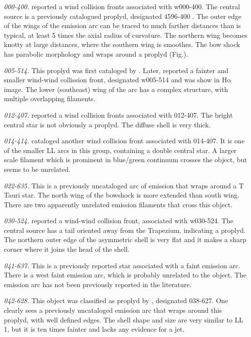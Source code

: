 \documentclass[iop, apj]{emulateapj}
\newcommand\ha{\ensuremath{\mathrm{H\alpha}}}
\begin{document}
\textit{000-400.} \citet{Bally:2000a} reported a wind collision fronts associated with w000-400. The central source is a previously catalogued proplyd, designated 4596-400 \citep{Ricci:2008a}. The outer edge of the wings of the emission arc can be traced to much farther distances than is typical, at least 5 times the axial radius of curvature. The northern wing becomes knotty at large distances, where  the southern wing is smoothes. The bow shock has parabolic morphology and wraps around a proplyd (Fig.).   

\textit{005-514.} This proplyd was first cataloged by \citet{ODell:1996a}. Later, \citet{Bally:2000a} reported a fainter and smaller wind-wind collission front, designated w005-514 and was show in \ha{} image. The lower (southeast) wing of the arc has a complex structure, with multiple overlapping filaments.

\textit{012-407.} \citet{Bally:2000a} reported a wind collision fronts associated with 012-407. The bright central star is not obviously a proplyd. The diffuse shell is very thick.  

\textit{014-414.} \citet{Bally:2000a} cataloged another wind collision front associated with 014-407. It is one of the smaller LL arcs in this group, containing a double central star. A larger scale filament which is prominent in blue/green continuum crosses the object, but seems to be unrelated. 

\textit{022-635.} This is a previously uncataloged arc of emission that wraps around a T Tauri star. The north wing of the bowshock is more extended than south wing. There are two apparently unrelated emission filaments that cross this object. 

\textit{030-524.} \citet{Bally:2000a} reported a wind-wind collision front, associated with w030-524. The central source has a tail oriented away from the Trapezium, indicating a proplyd. The northern outer edge of the asymmetric shell is very flat and it makes a sharp corner where it joins the head of the shell.

\textit{041-637.} This is a previously reported star \citep{Da-Rio:2009a} associated with a faint emission arc. There is a west faint emission arc, which is probably unrelated to the object. The emission arc has not been previously reported in the literature.

\textit{042-628.} This object was classified as proplyd by \citet{Ricci:2008a}, designated 038-627. One clearly sees a previously uncataloged emission arc that wraps around this proplyd, with well defined edges. The shell shape and size are very similar to LL 1, but it is ten times fainter and lacks any evidence for a jet.    
\end{document}
